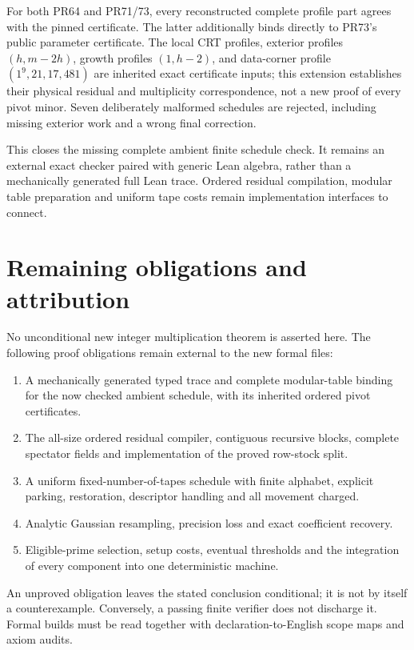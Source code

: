 \documentclass[11pt]{article}
\begin{document}
For both PR64 and PR71/73, every reconstructed complete profile part agrees
with the pinned certificate. The latter additionally binds directly to
PR73's public parameter certificate. The local CRT profiles, exterior
profiles $(h,m-2h)$, growth profiles $(1,h-2)$, and data-corner profile
$(1^9,21,17,481)$ are inherited exact certificate inputs; this extension
establishes their physical residual and multiplicity correspondence, not
a new proof of every pivot minor. Seven deliberately malformed schedules
are rejected, including missing exterior work and a wrong final correction.

This closes the missing complete ambient finite schedule check. It remains
an external exact checker paired with generic Lean algebra, rather than a
mechanically generated full Lean trace. Ordered residual compilation,
modular table preparation and uniform tape costs remain implementation
interfaces to connect.

\section{Remaining obligations and attribution}
No unconditional new integer multiplication theorem is asserted here.
The following proof obligations remain external to the new formal files:
\begin{enumerate}
\item A mechanically generated typed trace and complete modular-table binding
for the now checked ambient schedule, with its inherited ordered pivot certificates.
\item The all-size ordered residual compiler, contiguous recursive blocks,
complete spectator fields and implementation of the proved row-stock split.
\item A uniform fixed-number-of-tapes schedule with finite alphabet, explicit
parking, restoration, descriptor handling and all movement charged.
\item Analytic Gaussian resampling, precision loss and exact coefficient recovery.
\item Eligible-prime selection, setup costs, eventual thresholds and the
integration of every component into one deterministic machine.
\end{enumerate}
An unproved obligation leaves the stated conclusion conditional; it is not
by itself a counterexample. Conversely, a passing finite verifier does not
discharge it. Formal builds must be read together with declaration-to-English
scope maps and axiom audits.
\end{document}
